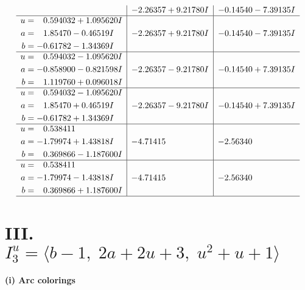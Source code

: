 \documentclass[1p]{elsarticle_modified}
\theoremstyle{definition}
\begin{document}
$$\begin{array}{c|c|c}
 & -2.26357 + 9.21780 I & -0.14540 - 7.39135 I \\ \hline\begin{aligned}
u &= \phantom{-}0.594032 + 1.095620 I \\
a &= \phantom{-}1.85470 - 0.46519 I \\
b &= -0.61782 - 1.34369 I\end{aligned}
 & -2.26357 + 9.21780 I & -0.14540 - 7.39135 I \\ \hline\begin{aligned}
u &= \phantom{-}0.594032 - 1.095620 I \\
a &= -0.858900 - 0.821598 I \\
b &= \phantom{-}1.119760 + 0.096018 I\end{aligned}
 & -2.26357 - 9.21780 I & -0.14540 + 7.39135 I \\ \hline\begin{aligned}
u &= \phantom{-}0.594032 - 1.095620 I \\
a &= \phantom{-}1.85470 + 0.46519 I \\
b &= -0.61782 + 1.34369 I\end{aligned}
 & -2.26357 - 9.21780 I & -0.14540 + 7.39135 I \\ \hline\begin{aligned}
u &= \phantom{-}0.538411\phantom{ +0.000000I} \\
a &= -1.79974 + 1.43818 I \\
b &= \phantom{-}0.369866 - 1.187600 I\end{aligned}
 & -4.71415\phantom{ +0.000000I} & -2.56340\phantom{ +0.000000I} \\ \hline\begin{aligned}
u &= \phantom{-}0.538411\phantom{ +0.000000I} \\
a &= -1.79974 - 1.43818 I \\
b &= \phantom{-}0.369866 + 1.187600 I\end{aligned}
 & -4.71415\phantom{ +0.000000I} & -2.56340\phantom{ +0.000000I}\\
 \hline 
 \end{array}$$\newpage\newpage\renewcommand{\arraystretch}{1}
\centering \section*{III. $I^u_{3}= \langle b-1,\;2 a+2 u+3,\;u^2+u+1 \rangle$}
\flushleft \textbf{(i) Arc colorings}\\
\end{document}
